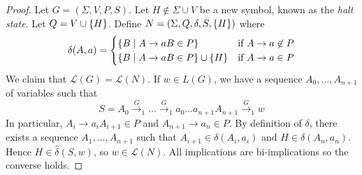 \begin{proof}
	Let \( G = (\Sigma, V, P, S) \).
	Let \( H \not\in \Sigma \cup V \) be a new symbol, known as the \emph{halt state}.
	Let \( Q = V \cup \qty{H} \).
	Define \( N = (\Sigma, Q, \delta, S, \qty{H}) \) where
	\[ \delta(A,a) = \begin{cases}
		\qty{B \mid A \to aB \in P} & \text{if } A \to a \not\in P \\
		\qty{B \mid A \to aB \in P} \cup \qty{H} & \text{if } A \to a \in P
	\end{cases} \]
	We claim that \( \mathcal L(G) = \mathcal L(N) \).
	If \( w \in L(G) \), we have a sequence \( A_0, \dots, A_{n+1} \) of variables such that
	\[ S = A_0 \xrightarrow G_1 \dots \xrightarrow G_1 a_0\dots a_{n+1} A_{n+1} \xrightarrow G_1 w \]
	In particular, \( A_i \to a_i A_{i+1} \in P \) and \( A_{n+1} \to a_n \in P \).
	By definition of \( \delta \), there exists a sequence \( A_1, \dots, A_{n+1} \) such that \( A_{i+1} \in \delta(A_i, a_i) \) and \( H \in \delta(A_n, a_n) \).
	Hence \( H \in \hat\delta(S,w) \), so \( w \in \mathcal L(N) \).
	All implications are bi-implications so the converse holds.
\end{proof}

